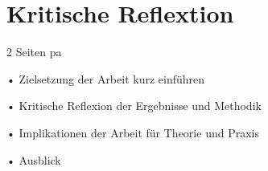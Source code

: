 \chapter{Kritische Reflextion}

2 Seiten pa

•  Zielsetzung der Arbeit kurz einführen


• Kritische Reflexion der Ergebnisse und
Methodik

• Implikationen der Arbeit für Theorie und Praxis

• Ausblick